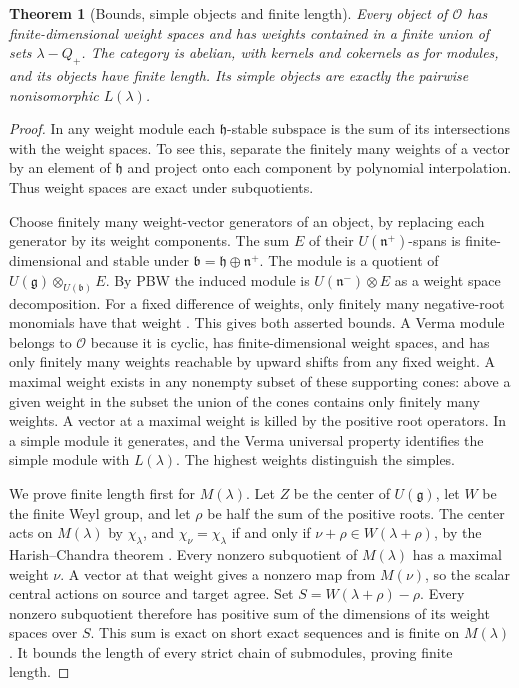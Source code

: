 \documentclass[11pt,oneside,openany]{book}
\newtheorem{theorem}{Theorem}[chapter]
\theoremstyle{definition}
\theoremstyle{remark}
\begin{document}
\begin{theorem}[Bounds, simple objects and finite length]
\label{res:LO02}
Every object of \(\mathcal O\) has finite-dimensional weight spaces
and has weights contained in a finite union of sets \(\lambda-Q_+\).
The category is abelian, with kernels and cokernels as for modules,
and its objects have finite length. Its simple objects are exactly
the pairwise nonisomorphic \(L(\lambda)\).
\end{theorem}
\begin{proof}
In any weight module each \(\mathfrak h\)-stable subspace is the
sum of its intersections with the weight spaces. To see this,
separate the finitely many weights of a vector by an element of
\(\mathfrak h\) and project onto each component by polynomial
interpolation. Thus weight spaces are exact under subquotients.

Choose finitely many weight-vector generators of an object, by
replacing each generator by its weight components. The sum \(E\) of
their \(U(\mathfrak n^+)\)-spans is finite-dimensional and stable under
\(\mathfrak b=\mathfrak h\oplus\mathfrak n^+\). The module is a quotient of
\(U(\mathfrak g)\otimes_{U(\mathfrak b)}E\).
By PBW the induced module is \(U(\mathfrak n^-)\otimes E\) as a
weight space decomposition. For a fixed difference of weights, only
finitely many negative-root monomials have that weight
\cite[Result G02, PDF p.~44]{mg-lie}. This gives both asserted bounds.
A Verma module belongs to \(\mathcal O\) because it is cyclic,
has finite-dimensional weight spaces, and has only finitely many
weights reachable by upward shifts from any fixed weight.
A maximal weight exists in any nonempty subset of these supporting
cones: above a given weight in the subset the union of the cones
contains only finitely many weights. A vector at a maximal weight
is killed by the positive root operators. In a simple module it
generates, and the Verma universal property identifies the simple
module with \(L(\lambda)\). The highest weights distinguish the simples.

We prove finite length first for \(M(\lambda)\). Let \(Z\) be the
center of \(U(\mathfrak g)\), let \(W\) be the finite Weyl group, and
let \(\rho\) be half the sum of the positive roots. The center acts
on \(M(\lambda)\) by \(\chi_\lambda\), and
\(\chi_\nu=\chi_\lambda\) if and only if
\(\nu+\rho\in W(\lambda+\rho)\), by the Harish--Chandra theorem
\cite[Result H08, PDF pp.~54--55]{mg-lie}.
Every nonzero subquotient of \(M(\lambda)\) has a maximal weight
\(\nu\). A vector at that weight gives a nonzero map from
\(M(\nu)\), so the scalar central actions on source and target
agree. Set
\(S=W(\lambda+\rho)-\rho\). Every nonzero subquotient therefore
has positive sum of the dimensions of its weight spaces over \(S\).
This sum is exact on short exact sequences and is finite on
\(M(\lambda)\). It bounds the length of every strict chain of
submodules, proving finite length.


\end{proof}
\end{document}
